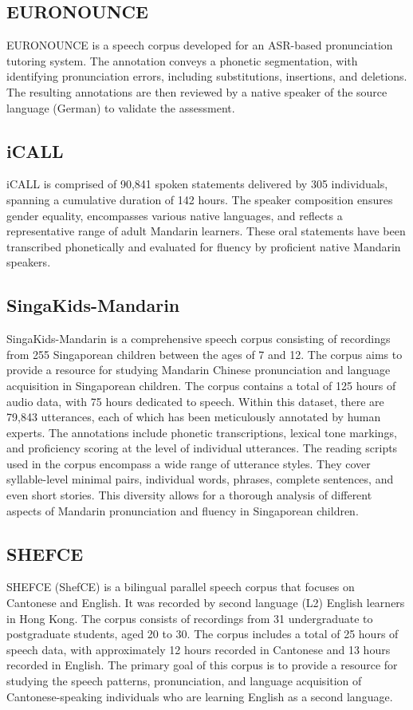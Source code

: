 \subsection{EURONOUNCE \cite{euronounce}}
EURONOUNCE is a speech corpus developed for an ASR-based pronunciation tutoring system. The annotation conveys a phonetic segmentation, with identifying pronunciation errors, including substitutions, insertions, and deletions. The resulting annotations are then reviewed by a native speaker of the source language (German) to validate the assessment. 

\subsection{iCALL \cite{chen2015icall}}
iCALL is comprised of 90,841 spoken statements delivered by 305 individuals, spanning a cumulative duration of 142 hours. The speaker composition ensures gender equality, encompasses various native languages, and reflects a representative range of adult Mandarin learners. These oral statements have been transcribed phonetically and evaluated for fluency by proficient native Mandarin speakers.

\subsection{SingaKids-Mandarin \cite{chen2016singakids}}
SingaKids-Mandarin is a comprehensive speech corpus consisting of recordings from 255 Singaporean children between the ages of 7 and 12. The corpus aims to provide a resource for studying Mandarin Chinese pronunciation and language acquisition in Singaporean children. The corpus contains a total of 125 hours of audio data, with 75 hours dedicated to speech. Within this dataset, there are 79,843 utterances, each of which has been meticulously annotated by human experts. The annotations include phonetic transcriptions, lexical tone markings, and proficiency scoring at the level of individual utterances. The reading scripts used in the corpus encompass a wide range of utterance styles. They cover syllable-level minimal pairs, individual words, phrases, complete sentences, and even short stories. This diversity allows for a thorough analysis of different aspects of Mandarin pronunciation and fluency in Singaporean children.

\subsection{SHEFCE \cite{shefce}}
SHEFCE (ShefCE) is a bilingual parallel speech corpus that focuses on Cantonese and English. It was recorded by second language (L2) English learners in Hong Kong. The corpus consists of recordings from 31 undergraduate to postgraduate students, aged 20 to 30. The corpus includes a total of 25 hours of speech data, with approximately 12 hours recorded in Cantonese and 13 hours recorded in English. The primary goal of this corpus is to provide a resource for studying the speech patterns, pronunciation, and language acquisition of Cantonese-speaking individuals who are learning English as a second language.

